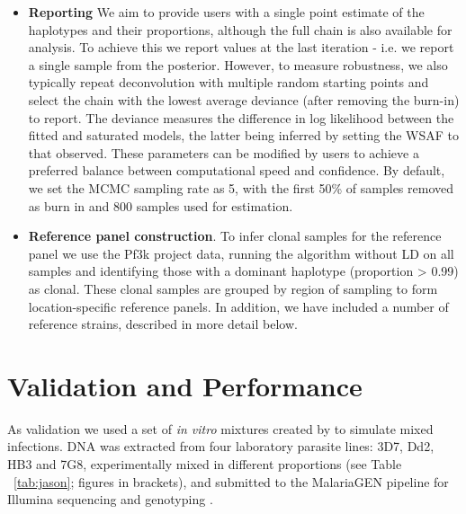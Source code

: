 \documentclass{bioinfo}
\begin{document}
\begin{itemize}
\item {\bf Reporting} We aim to provide users with a single point estimate of the haplotypes and their proportions, although the full chain is also available for analysis.  To achieve this we report values at the last iteration - i.e. we report a single sample from the posterior.  However, to measure robustness, we also typically repeat deconvolution with multiple random starting points and select the chain with the lowest average deviance (after removing the burn-in) to report. The deviance measures the difference in log likelihood between the fitted and saturated models, the latter being inferred by setting the WSAF to that observed.   These parameters can be modified by users to achieve a preferred balance between computational speed and confidence.  By default, we set the MCMC sampling rate as 5, with the first 50\% of samples removed as burn in and 800 samples used for estimation.

\item {\bf Reference panel construction}. To infer clonal samples for the reference panel we use the Pf3k \citep{Pf3k2016} project data, running the algorithm without LD on all samples and identifying those with a dominant haplotype (proportion > 0.99) as clonal.  These clonal samples are grouped by region of sampling to form location-specific reference panels.  In addition, we have included a number of reference strains, described in more detail below.

\end{itemize}




\section{Validation and Performance}

As validation we used a set of {\it in vitro} mixtures created by \citet{Wendler2015} to simulate mixed infections. DNA was extracted from four laboratory parasite lines: 3D7, Dd2, HB3 and 7G8, experimentally mixed in different proportions (see Table ~\ref{tab:jason}; figures in brackets), and submitted to the MalariaGEN pipeline \citep{MalariaGen2008} for Illumina sequencing and genotyping \citep{Manske2012}.
\end{document}
